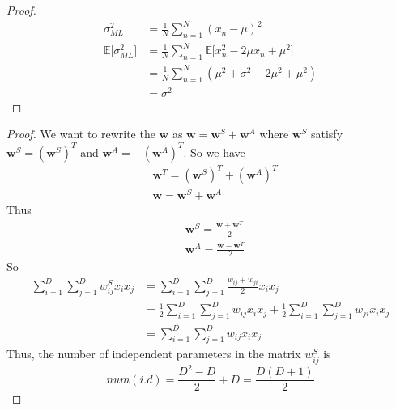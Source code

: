 \documentclass[12pt, a4paper]{article}
\newcommand{\E}{\mathbb{E}}
\newenvironment{exercise}[2][Ex]{\begin{trivlist}
\item[\hskip \labelsep {\bfseries #1}\hskip \labelsep {\bfseries #2.}]}{\end{trivlist}}
\begin{document}
\begin{exercise}{1.13(*)}
    \begin{proof}
        \begin{align*}
            \sigma^2_{ML}&=\frac{1}{N}\sum_{n=1}^N(x_n-\mu)^2\\
            \E\lbrack \sigma^2_{ML}\rbrack&=\frac{1}{N}\sum_{n=1}^N\E\lbrack x_n^2-2\mu x_n+
            \mu^2\rbrack\\
            &=\frac{1}{N}\sum_{n=1}^N(\mu^2+\sigma^2-2\mu^2+\mu^2)\\
            &=\sigma^2
        \end{align*}
    \end{proof}
\end{exercise}
\begin{exercise}{1.14(*)}
    \begin{proof}
        We want to rewrite the $\bm{w}$ as $\bm{w}=\bm{w}^S+\bm{w}^A$ where $\bm{w}^S$ satisfy
        $\bm{w}^S=(\bm{w}^S)^T$ and $\bm{w}^A=-(\bm{w}^A)^T$. So we have
        \begin{align*}
            &\bm{w}^T=(\bm{w}^S)^T+(\bm{w}^A)^T\\
            &\bm{w}=\bm{w}^S+\bm{w}^A
        \end{align*}
        Thus
        \begin{align*}
            &\bm{w}^S=\frac{\bm{w}+\bm{w}^T}{2}\\
            &\bm{w}^A=\frac{\bm{w}-\bm{w}^T}{2}
        \end{align*}
        So
        \begin{align*}
            \sum_{i=1}^D\sum_{j=1}^Dw_{ij}^Sx_ix_j&=\sum_{i=1}^D\sum_{j=1}^D\frac{w_{ij}+w_{ji}}
            {2}x_ix_j\\
            &=\frac{1}{2}\sum_{i=1}^D\sum_{j=1}^Dw_{ij}x_ix_j+\frac{1}{2}\sum_{i=1}^D
            \sum_{j=1}^Dw_{ji}x_ix_j\\
            &=\sum_{i=1}^D\sum_{j=1}^Dw_{ij}x_ix_j
        \end{align*}
        Thus, the number of independent parameters in the matrix $w_{ij}^S$ is 
        \begin{equation}
            \label{eq1}
            num(i.d)=\frac{D^2-D}{2}+D=\frac{D(D+1)}{2}
        \end{equation}
    \end{proof}
\end{exercise}
\end{document}
